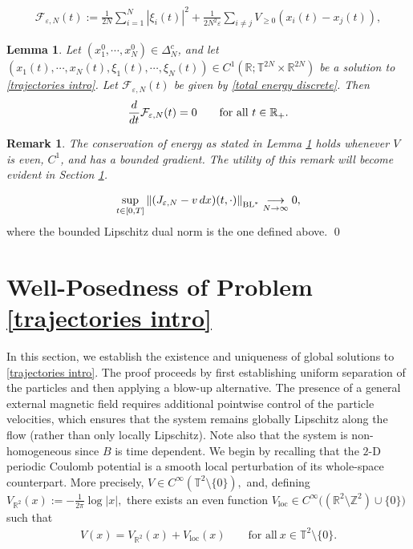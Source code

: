 \documentclass[10pt,a4paper]{amsart}
\newtheorem{lem}{Lemma}
\newtheorem{rem}{Remark}
\def\dd{{\rm d}}
\begin{document}
\begin{align}
\mathcal{F}_{\varepsilon,N}(t):=\frac{1}{2N}\sum_{i=1}^{N}\left\vert \xi_{i}(t)\right\vert^{2}+\frac{1}{2N^{2}\varepsilon}\sum_{i\neq j}V_{\geq 0}(x_{i}(t)-x_{j}(t)),\label{total energy discrete}     
\end{align}

 \begin{lem} \label{Conservation of discrete energy}
Let $(x_{1}^{0},\cdots\!,x_{N}^{0})\in \Delta_{N}^{c}$, 
and let $(x_{1}(t),\cdots\!,x_{N}(t),\xi_{1}(t),\cdots\!,\xi_{N}(t))\in C^{1}(\mathbb{R};\mathbb{T}^{2N}\times \mathbb{R}^{2N})$ 
be a solution to \eqref{trajectories intro}. Let $\mathcal{F}_{\varepsilon,N}(t)$ be given by \eqref{total energy discrete}. Then
\begin{align*}
\frac{\dd}{\dd t}\mathcal{F}_{\varepsilon,N}(t)=0 \qquad \mbox{for all}\ t\in \mathbb{R}_{+}.     
\end{align*}
\end{lem}

\begin{rem}
The conservation of energy as stated in {\rm Lemma \ref{Conservation of discrete energy}} holds whenever $V$ is even, $C^1$, and has a bounded gradient. The utility of this remark will become evident in {\rm Section \ref{wellposed-trajectories-sec}}.   \label{rem about conse of energy}  
\end{rem}

\begin{align*}
\underset{t\in [0,T]}{\sup}\left\Vert (J_{\varepsilon,N}-v\,\dd x)(t,\cdot)\right\Vert_{\mathrm{BL}^{*}}\underset{N\rightarrow \infty}{\longrightarrow} 0,
\end{align*}
where the bounded Lipschitz dual norm is the one defined above.
\qed


\section{Well-Posedness of Problem \eqref{trajectories intro}}
\label{wellposed-trajectories-sec}
In this section, we establish the existence and uniqueness of global solutions to \eqref{trajectories intro}. The proof proceeds by first establishing uniform separation of the particles and then applying a blow-up alternative. The presence of a general external magnetic field requires additional pointwise control of the particle velocities, which ensures that the system remains globally Lipschitz along the flow (rather than only locally Lipschitz). Note also that the system is non-homogeneous since $B$ is time dependent. 
We begin by recalling that the $2$-D periodic Coulomb potential is a smooth local perturbation of its whole-space counterpart. More precisely,
$
V\in C^\infty(\mathbb T^2\setminus\{0\}),
$
and, defining
$
V_{\mathbb R^2}(x):=-\frac{1}{2\pi}\log|x|,
$
there exists an even function
$
V_{\mathrm{loc}}\in C^\infty\big((\mathbb R^2\setminus\mathbb Z^2)\cup\{0\}\big)
$
such that
\begin{align*}
V(x)
=V_{\mathbb{R}^{2}}(x)+V_{\mathrm{loc}}(x) \qquad \mbox{for all}\ x\in \mathbb{T}^{2}\setminus \{0\}.     
\end{align*}
\end{document}
